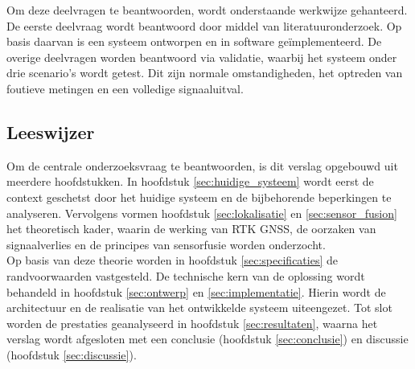 Om deze deelvragen te beantwoorden, wordt onderstaande werkwijze gehanteerd. De eerste deelvraag wordt beantwoord door middel van literatuuronderzoek. Op basis daarvan is een systeem ontworpen en in software geïmplementeerd. De overige deelvragen worden beantwoord via validatie, waarbij het systeem onder drie scenario's wordt getest. Dit zijn normale omstandigheden, het optreden van foutieve metingen en een volledige signaaluitval.

\subsection{Leeswijzer}
Om de centrale onderzoeksvraag te beantwoorden, is dit verslag opgebouwd uit meerdere hoofdstukken. In hoofdstuk \ref{sec:huidige_systeem} wordt eerst de context geschetst door het huidige systeem en de bijbehorende beperkingen te analyseren. Vervolgens vormen hoofdstuk \ref{sec:lokalisatie} en \ref{sec:sensor_fusion} het theoretisch kader, waarin de werking van RTK GNSS, de oorzaken van signaalverlies en de principes van sensorfusie worden onderzocht. \\

Op basis van deze theorie worden in hoofdstuk \ref{sec:specificaties} de randvoorwaarden vastgesteld. De technische kern van de oplossing wordt behandeld in hoofdstuk \ref{sec:ontwerp} en \ref{sec:implementatie}. Hierin wordt de architectuur en de realisatie van het ontwikkelde systeem uiteengezet. Tot slot worden de prestaties geanalyseerd in hoofdstuk \ref{sec:resultaten}, waarna het verslag wordt afgesloten met een conclusie (hoofdstuk \ref{sec:conclusie}) en discussie (hoofdstuk \ref{sec:discussie}).

\newpage